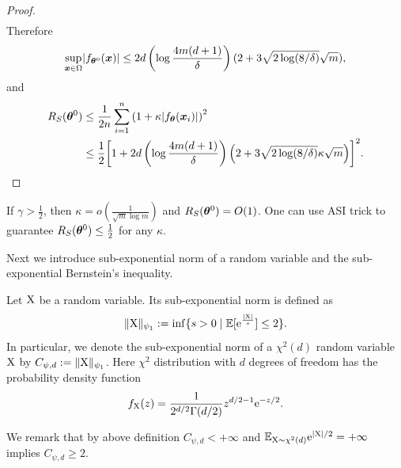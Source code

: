 \documentclass{article}
\begin{document}
\begin{proof}
\begin{equation}
\begin{aligned}
        \end{aligned}
    \end{equation}
    Therefore
    \begin{equation}
        \sup_{\bm{x}\in\Omega}\lvert f_{\bm{\theta}^0}(\bm{x})\rvert\leq 2d\left(\log\frac{4m(d+1)}{\delta}\right)(2+3\sqrt{2\log(8/\delta)}\sqrt{m}),
    \end{equation}
    and
    \begin{equation}
        \begin{aligned}
            R_S(\bm{\theta}^0)
             & \leq\frac{1}{2n}\sum_{i=1}^n{\left(1+\kappa\lvert f_{\bm{\theta}}(\bm{x}_i)\rvert\right)}^2                                                    \\
             & \leq\frac{1}{2}{\left[1+2d\left(\log\frac{4m(d+1)}{\delta}\right)\left(2+3\sqrt{2\log(8/\delta)}\kappa\sqrt{m}\right)\right]}^2.
        \end{aligned}
    \end{equation}
\end{proof}
\begin{rmk}
    If $\gamma>\frac{1}{2}$, then $\kappa=o(\frac{1}{\sqrt{m}\log m})$ and $R_S(\bm{\theta}^0)=O(1)$. One can use ASI trick to guarantee $R_S(\bm{\theta}^0)\leq\frac{1}{2}$ for any $\kappa$.
\end{rmk}
Next we introduce sub-exponential norm of a random variable and the sub-exponential Bernstein's inequality.
\begin{defi}
    Let $\textnormal{X}$ be a random variable. Its sub-exponential norm is defined as
    \begin{equation}
        \lVert\textnormal{X}\rVert_{\psi_1} := \inf\{s>0 \mid \mathbb{E}[\mathrm{e}^{\frac{\lvert\textnormal{X}\rvert}{s}}]\leq 2\}.
    \end{equation}
    In particular, we denote the sub-exponential norm of a $\chi^2(d)$ random variable $\textnormal{X}$ by $C_{\psi,d}:=\lVert\textnormal{X}\rVert_{\psi_1}$. Here $\chi^2$ distribution with $d$ degrees of freedom has the probability density function
    \begin{equation}
        f_{\textnormal{X}}(z)=\frac{1}{2^{d/2}\Gamma(d/2)}z^{d/2-1}\mathrm{e}^{-z/2}.
    \end{equation}
\end{defi}
\begin{rmk}
    We remark that by above definition $C_{\psi,d}<+\infty$ and $\mathbb{E}_{\textnormal{X}\sim\chi^2(d)}\mathrm{e}^{\lvert\textnormal{X}\rvert/2}=+\infty$ implies $C_{\psi,d}\geq 2$.
\end{rmk}
\end{document}
